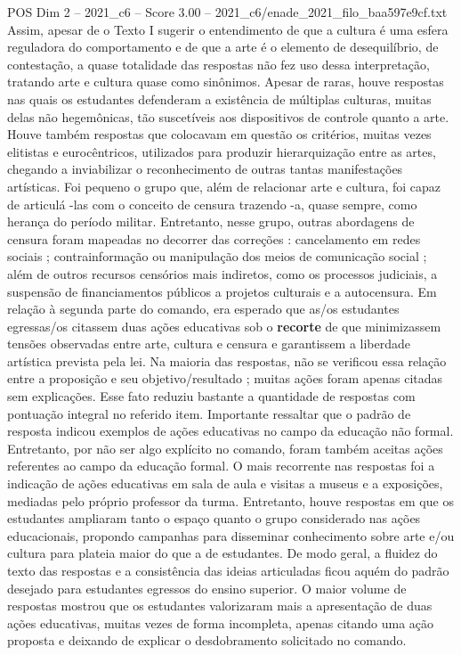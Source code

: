 \begin{textsample}{POS Dim 2 – 2021\_c6 – Score 3.00 – 2021\_c6/enade\_2021\_filo\_baa597e9cf.txt}
Assim, apesar de o Texto I sugerir o entendimento de que a cultura é uma esfera reguladora do comportamento e de que a arte é o elemento de desequilíbrio, de contestação, a quase totalidade das respostas não fez uso dessa interpretação, tratando arte e cultura quase como sinônimos.
Apesar de raras, houve respostas nas quais os estudantes defenderam a existência de múltiplas culturas, muitas delas não hegemônicas, tão suscetíveis aos dispositivos de controle quanto a arte.
Houve também respostas que colocavam em questão os critérios, muitas vezes elitistas e eurocêntricos, utilizados para produzir hierarquização entre as artes, chegando a inviabilizar o reconhecimento de outras tantas manifestações artísticas.
Foi pequeno o grupo que, além de relacionar arte e cultura, foi capaz de articulá -las com o conceito de censura trazendo -a, quase sempre, como herança do período militar.
Entretanto, nesse grupo, outras abordagens de censura foram mapeadas no decorrer das correções : cancelamento em redes sociais ; contrainformação ou manipulação dos meios de comunicação social ; além de outros recursos censórios mais indiretos, como os processos judiciais, a suspensão de financiamentos públicos a projetos culturais e a autocensura.
Em relação à segunda parte do comando, era esperado que as/os estudantes egressas/os citassem duas ações educativas sob o \textbf{recorte} de que minimizassem tensões observadas entre arte, cultura e censura e garantissem a liberdade artística prevista pela lei.
Na maioria das respostas, não se verificou essa relação entre a proposição e seu objetivo/resultado ; muitas ações foram apenas citadas sem explicações.
Esse fato reduziu bastante a quantidade de respostas com pontuação integral no referido item.
Importante ressaltar que o padrão de resposta indicou exemplos de ações educativas no campo da educação não formal.
Entretanto, por não ser algo explícito no comando, foram também aceitas ações referentes ao campo da educação formal.
O mais recorrente nas respostas foi a indicação de ações educativas em sala de aula e visitas a museus e a exposições, mediadas pelo próprio professor da turma.
Entretanto, houve respostas em que os estudantes ampliaram tanto o espaço quanto o grupo considerado nas ações educacionais, propondo campanhas para disseminar conhecimento sobre arte e/ou cultura para plateia maior do que a de estudantes.
De modo geral, a fluidez do texto das respostas e a consistência das ideias articuladas ficou aquém do padrão desejado para estudantes egressos do ensino superior.
O maior volume de respostas mostrou que os estudantes valorizaram mais a apresentação de duas ações educativas, muitas vezes de forma incompleta, apenas citando uma ação proposta e deixando de explicar o desdobramento solicitado no comando.

\end{textsample}
